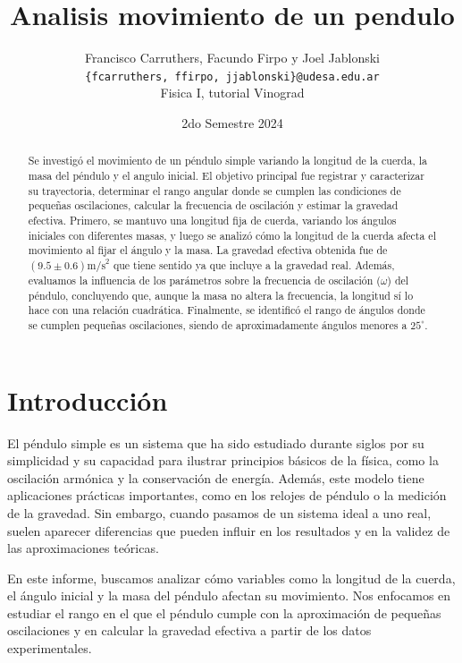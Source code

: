 \documentclass[12pt,a4]{article}
\title{Analisis movimiento de un pendulo}
\author{Francisco Carruthers, Facundo Firpo y Joel Jablonski\\ [2mm]
\small \texttt{\{fcarruthers, ffirpo, jjablonski\}@udesa.edu.ar}\\
\small Fisica I, tutorial Vinograd}
\date{2do Semestre 2024}
\begin{document}
\maketitle

\begin{abstract}
    Se investigó el movimiento de un péndulo simple variando la longitud de la cuerda, la masa del péndulo y el angulo inicial. 
    El objetivo principal fue registrar y caracterizar su trayectoria, determinar el rango angular donde se cumplen las condiciones de pequeñas oscilaciones, calcular la frecuencia de oscilación y estimar la gravedad efectiva. 
    Primero, se mantuvo una longitud fija de cuerda, variando los ángulos iniciales con diferentes masas, y luego se analizó cómo la longitud de la cuerda afecta el movimiento al fijar el ángulo y la masa. 
    La gravedad efectiva obtenida fue de $(9.5 \pm 0.6) \text{m/s}^2$ que tiene sentido ya que incluye a la gravedad real. 
    Además, evaluamos la influencia de los parámetros sobre la frecuencia de oscilación ($\omega$) del péndulo, concluyendo que, aunque la masa no altera la frecuencia, la longitud sí lo hace con una relación cuadrática. 
    Finalmente, se identificó el rango de ángulos donde se cumplen pequeñas oscilaciones, siendo de aproximadamente ángulos menores a $25^\circ$.

\end{abstract}

\section{Introducción}

El péndulo simple es un sistema que ha sido estudiado durante siglos por su simplicidad y su capacidad para ilustrar principios básicos de la física, como la oscilación armónica y la conservación de energía. 
Además, este modelo tiene aplicaciones prácticas importantes, como en los relojes de péndulo o la medición de la gravedad. 
Sin embargo, cuando pasamos de un sistema ideal a uno real, suelen aparecer diferencias que pueden influir en los resultados y en la validez de las aproximaciones teóricas.

En este informe, buscamos analizar cómo variables como la longitud de la cuerda, el ángulo inicial y la masa del péndulo afectan su movimiento. 
Nos enfocamos en estudiar el rango en el que el péndulo cumple con la aproximación de pequeñas oscilaciones y en calcular la gravedad efectiva a partir de los datos experimentales.
\end{document}
